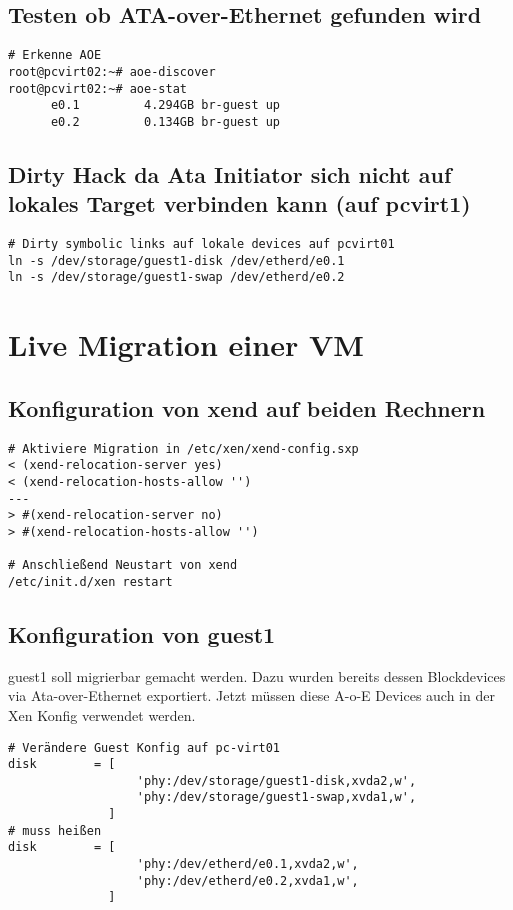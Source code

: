 \section{Testen ob ATA-over-Ethernet gefunden wird}

\setupVerbatimOut
\begin{verbatim}
# Erkenne AOE 
root@pcvirt02:~# aoe-discover 
root@pcvirt02:~# aoe-stat                                                       
      e0.1         4.294GB br-guest up            
      e0.2         0.134GB br-guest up  
\end{verbatim}

\section{Dirty Hack da Ata Initiator sich nicht auf lokales Target verbinden kann (auf pcvirt1)}

\setupVerbatimOut
\begin{verbatim}
# Dirty symbolic links auf lokale devices auf pcvirt01
ln -s /dev/storage/guest1-disk /dev/etherd/e0.1
ln -s /dev/storage/guest1-swap /dev/etherd/e0.2 
\end{verbatim}

\chapter{Live Migration einer VM}

\section{Konfiguration von xend auf beiden Rechnern}

\setupVerbatimOut
\begin{verbatim}
# Aktiviere Migration in /etc/xen/xend-config.sxp
< (xend-relocation-server yes)
< (xend-relocation-hosts-allow '')
---
> #(xend-relocation-server no)
> #(xend-relocation-hosts-allow '')

# Anschließend Neustart von xend
/etc/init.d/xen restart
\end{verbatim}

\section{Konfiguration von guest1}

guest1 soll migrierbar gemacht werden. Dazu wurden bereits dessen Blockdevices via Ata-over-Ethernet exportiert. Jetzt müssen diese A-o-E Devices auch in der Xen Konfig
 verwendet werden.
\setupVerbatimOut
\begin{verbatim}
# Verändere Guest Konfig auf pc-virt01
disk        = [
                  'phy:/dev/storage/guest1-disk,xvda2,w',
                  'phy:/dev/storage/guest1-swap,xvda1,w',
              ]
# muss heißen
disk        = [
                  'phy:/dev/etherd/e0.1,xvda2,w',
                  'phy:/dev/etherd/e0.2,xvda1,w',
              ]
\end{verbatim}

